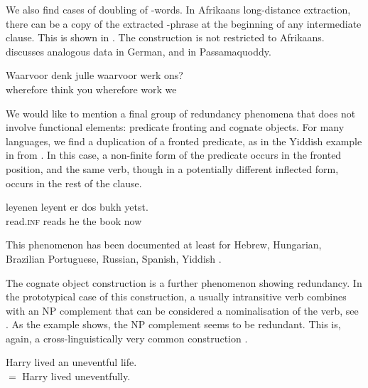 \documentclass[output=paper]{langscibook}
\begin{document}
We also find cases of doubling of -words. 
In Afrikaans long-distance extraction, there can be 
a copy of the extracted -phrase at the beginning of  any intermediate clause.
This is shown in . 
The construction is not restricted to Afrikaans. 
\citet{Hoehle:19wh} discusses analogous data in German, and \citet{Bruening:06} in Passamaquoddy. 


\vbox{
\ea
\gll 
Waarvoor denk julle waarvoor werk ons?\\
wherefore think you wherefore work we\\
\glt {}
\citep[725]{Plessis:77}\label{w-kopier}
\z 
}


\begin{sloppypar}
  We would like to mention a final group of redundancy phenomena that
  does not involve functional elements: predicate fronting and cognate
  objects.  For many languages, we find a duplication of a fronted
  predicate, as in the Yiddish example in  from
  \citet{Kaellgran:Prince:89}.  In this case, a non-finite form of the
  predicate occurs in the fronted position, and the same verb, though
  in a potentially different inflected form, occurs in the rest of the
  clause.
\end{sloppypar}

\ea
\gll leyenen leyent er dos bukh yetst.\\
read\textsc{.inf} reads he the book now\\
\glt {}
\citep[48]{Kaellgran:Prince:89}\label{yiddish-front}
\z 

\begin{sloppypar}
  This phenomenon has been documented at least for Hebrew, Hungarian,
  Brazilian Portuguese, Russian, Spanish, Yiddish \citep{Vicente:09}.
\end{sloppypar}

The cognate object construction is a further phenomenon showing
redundancy.  In the prototypical case of this construction, a usually
intransitive verb combines with an NP complement that can be
considered a nominalisation of the verb, see .  As the
example shows, the NP complement seems to be redundant.  This is,
again, a cross-linguistically very common construction
\citep{Jones:88,Massam:90,Mittwoch:98}.

\ea \label{ex-coc}
Harry lived an uneventful life. 
\\
$=$ Harry lived uneventfully.
\citep[89]{Jones:88}
\z 
\end{document}
